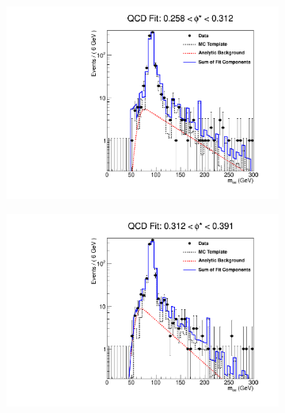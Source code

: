 \begin{figure}[!htbp]
    \centering
    \begin{subfigure}[b]{\SideBySidePlotWidth}
        \includegraphics[width=\linewidth]{figures/qcd_fits/qcd_fit_plot_for_25.pdf}
        \caption{}
        \label{fig:qcd_fit_25}
    \end{subfigure}%
    \begin{subfigure}[b]{\SideBySidePlotWidth}
        \includegraphics[width=\linewidth]{figures/qcd_fits/qcd_fit_plot_for_26.pdf}
        \caption{}
        \label{fig:qcd_fit_26}
    \end{subfigure}
    \begin{subfigure}[b]{\SideBySidePlotWidth}

\end{subfigure}
\end{figure}
